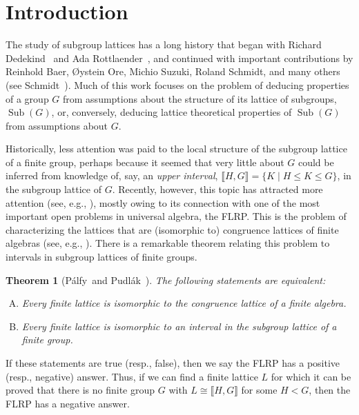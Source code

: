 \documentclass{gen-j-l}
\newcommand{\lb}{\ensuremath{\llbracket}}
\newcommand{\rb}{\ensuremath{\rrbracket}}
\newcommand{\<}{\ensuremath{\langle}}
\renewcommand{\>}{\ensuremath{\rangle}}
\theoremstyle{plain}
\newtheorem{theorem}{Theorem}[section]
\theoremstyle{definition}
\newcounter{prob}
\theoremstyle{remark}
\numberwithin{theorem}{section}
\numberwithin{claim}{section}
\numberwithin{equation}{section}
\numberwithin{conjecture}{section}
\newcommand{\Palfy}{P\'alfy}
\newcommand{\Pudlak}{Pudl\'ak}
\renewcommand{\leq}{\ensuremath{\leqslant}}
\newcommand{\Sub}{\ensuremath{\operatorname{Sub}}}
\newcommand{\2}{\ensuremath{\mathbf{2}}}
\newcommand{\3}{\ensuremath{\mathbf{3}}}
\begin{document}


\section{Introduction}
\label{sec:intro}
The study of subgroup lattices has a long history that began with
Richard Dedekind~\cite{Dedekind:1877} 
and 
Ada Rottlaender~\cite{Rottlaender:1928}, and
continued with important contributions by Reinhold Baer, 
{\O}ystein Ore, 
Michio Suzuki, 
Roland Schmidt, 
and many others (see Schmidt~\cite{Schmidt:1994}).
Much of this work focuses on the problem of deducing
properties of a group $G$ from assumptions about the structure of its lattice of
subgroups, $\Sub(G)$,  or, conversely, deducing lattice theoretical properties
of $\Sub(G)$ from assumptions about $G$. 

Historically, less attention was paid to the local structure of the
subgroup lattice of a finite group, perhaps because it seemed that very little
about $G$ could be inferred from knowledge of, say, an \emph{upper
  interval}, $\lb H,G \rb = \{K \mid H\leq K \leq G\}$,
in the subgroup lattice of $G$.
Recently, however, this topic has attracted more attention (see, e.g.,
\cite{Aschbacher:2009,Lucchini:1997,Basile:2001,Borner:1999,Kohler:1983,Lucchini:1994a,Palfy:1988,Palfy:1995}),
mostly owing to its connection with one of the most important open
problems in universal algebra,
the \ac{FLRP}. This is the problem of
characterizing the lattices that are (isomorphic to) congruence lattices of
finite algebras (see, e.g., \cite{Berman:1970,DeMeo:thesis,Palfy:1995,Palfy:2001}). 
There is a remarkable theorem relating this problem to intervals in subgroup
lattices of finite groups. 
\begin{theorem}[\Palfy\ and \Pudlak~\cite{Palfy:1980}]
\label{thm:P5}
The following statements are equivalent:
\begin{enumerate}[(A)]
\item Every finite lattice is isomorphic to
  the congruence lattice of a finite algebra.
\item Every finite lattice is isomorphic to
  an interval in the subgroup lattice of a finite group.
\end{enumerate}
\end{theorem}
If these statements are true (resp., false), then we say the \acs{FLRP} has
a positive (resp., negative) answer. 
Thus, if we can find a finite lattice $L$ for which it can be proved that there
is no finite group $G$ with $L \cong \lb H,G \rb$ for some $H< G$, then the
\acs{FLRP} has a negative answer.  
\end{document}
